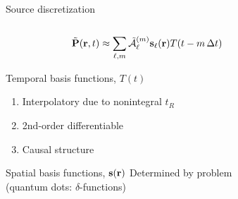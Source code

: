 \documentclass[aspectratio=169, usenames, dvipsnames]{beamer}
\begin{document}
\begin{frame}{Source discretization}
  \begin{columns}
    \begin{column}{0.5\textwidth}
      \begin{equation*}
        \tilde{\vb{P}}(\vb{r}, t) \approx \sum_{\ell, m} \tilde{\mathcal{A}}_{\ell}^\qty(m) \vb{s}_\ell(\vb{r}) T(t - m \, \Delta t)
      \end{equation*}
      \vspace{-10pt}
      \begin{block}{Temporal basis functions, $T(t)$}
        \begin{enumerate}
          \item Interpolatory due to nonintegral $t_R$
          \item 2$\text{nd}$-order differentiable
          \item Causal structure
        \end{enumerate}
      \end{block}

      \begin{block}{Spatial basis functions, $\vb{s}(\vb{r})$}
          Determined by problem \\
          \hfill{\small (quantum dots: $\delta$-functions)}
      \end{block}
    \end{column}
    \begin{column}{0.5\textwidth}
      {}\\[0.2cm]
      \\[0.5cm]
      
    \end{column}
  \end{columns}
\end{frame}
\end{document}
